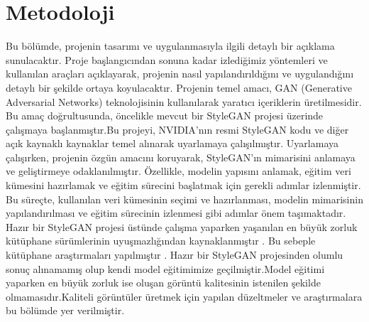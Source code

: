 \documentclass[12pt]{article}
\begin{document}
\section{Metodoloji}
Bu bölümde, projenin tasarımı ve uygulanmasıyla ilgili detaylı bir açıklama sunulacaktır. Proje başlangıcından sonuna kadar izlediğimiz yöntemleri ve kullanılan araçları açıklayarak, projenin nasıl yapılandırıldığını ve uygulandığını detaylı bir şekilde ortaya koyulacaktır.
Projenin temel amacı, GAN (Generative Adversarial Networks) teknolojisinin kullanılarak yaratıcı içeriklerin üretilmesidir. Bu amaç doğrultusunda, öncelikle mevcut bir StyleGAN projesi üzerinde çalışmaya başlanmıştır.Bu projeyi, NVIDIA'nın resmi StyleGAN kodu ve diğer açık kaynaklı kaynaklar temel alınarak uyarlamaya çalışılmıştır.\cite{Azmarie}
Uyarlamaya çalışırken, projenin özgün amacını koruyarak, StyleGAN'ın mimarisini anlamaya ve geliştirmeye odaklanılmıştır. Özellikle, modelin yapısını anlamak, eğitim veri kümesini hazırlamak ve eğitim sürecini başlatmak için gerekli adımlar izlenmiştir. Bu süreçte, kullanılan veri kümesinin seçimi ve hazırlanması, modelin mimarisinin yapılandırılması ve eğitim sürecinin izlenmesi gibi adımlar önem taşımaktadır.
Hazır bir StyleGAN projesi üstünde çalışma yaparken yaşanılan en büyük zorluk kütüphane sürümlerinin uyuşmazlığından kaynaklanmıştır . Bu sebeple kütüphane araştırmaları yapılmıştır . Hazır bir StyleGAN projesinden olumlu sonuç alınamamış olup kendi model eğitimimize geçilmiştir.Model eğitimi yaparken en büyük zorluk ise oluşan görüntü kalitesinin istenilen şekilde olmamasıdır.Kaliteli görüntüler üretmek için yapılan düzeltmeler ve araştırmalara bu bölümde yer verilmiştir.
\end{document}
